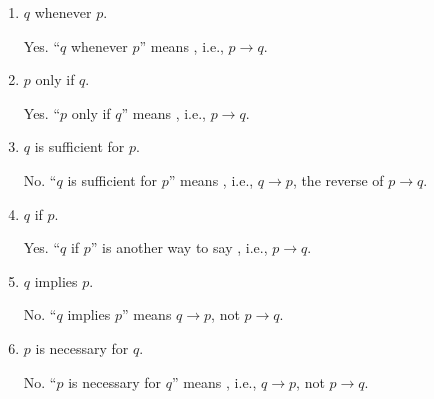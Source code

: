 \begin{enumerate}
\begin{enumerate}[label=\Alph*.]
    \item $q$ whenever $p$.\\
    \begin{subanswer}
      Yes. ``$q$ whenever $p$'' means , i.e., $p \rightarrow q$.
    \end{subanswer}

    \item $p$ only if $q$.\\
    \begin{subanswer}
      Yes. ``$p$ only if $q$'' means , i.e., $p \rightarrow q$.
    \end{subanswer}

    \item $q$ is sufficient for $p$.\\
    \begin{subanswer}
      No. ``$q$ is sufficient for $p$'' means , i.e., $q \rightarrow p$, the reverse of $p \rightarrow q$.
    \end{subanswer}

    \item $q$ if $p$.\\
    \begin{subanswer}
      Yes. ``$q$ if $p$'' is another way to say , i.e., $p \rightarrow q$.
    \end{subanswer}

    \item $q$ implies $p$.\\
    \begin{subanswer}
      No. ``$q$ implies $p$'' means $q \rightarrow p$, not $p \rightarrow q$.
    \end{subanswer}

    \item $p$ is necessary for $q$.\\
    \begin{subanswer}
      No. ``$p$ is necessary for $q$'' means , i.e., $q \rightarrow p$, not $p \rightarrow q$.
    \end{subanswer}
  \end{enumerate}

  \newpage


\end{enumerate}
